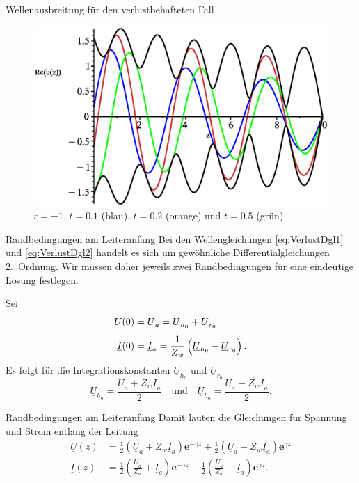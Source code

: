 \documentclass{beamer}
\begin{document}
\begin{frame}{Wellenausbreitung für den verlustbehafteten Fall}
\begin{figure}[H]
\begin{minipage}{0.32\textwidth}
            \includegraphics[width=\linewidth]{../graphics/Enveloppe/verlustbehaftet/R-1}
            \caption*{$r=-1$, $t=0.1$ (blau), $t=0.2$ (orange) und $t=0.5$ (grün)}
        \end{minipage}
    \end{figure}
\end{frame}


\begin{frame}{Randbedingungen am Leiteranfang}
Bei den Wellengleichungen \eqref{eq:VerlustDgl1} und \eqref{eq:VerlustDgl2} handelt es sich um
gewöhnliche Differentialgleichungen 2.~Ordnung. Wir müssen daher jeweils zwei Randbedingungen für
eine eindeutige Lösung festlegen.

\vspace{1ex}
Sei
\begin{align*}
    \underline{U}(0) &= \underline{U}_{a} = \underline{U}_{h_{0}} + \underline{U}_{r_{0}} \\[1ex]
    \underline{I}(0) &= \underline{I}_{a} = \frac{1}{Z_{w}}
    \left(
    \vphantom{\sqrt{1}{Z_{w}}}
    \underline{U}_{h_{0}} - \underline{U}_{r_{0}} \right).
\end{align*}
Es folgt für die Integrationskonstanten $\underline{U}_{h_{0}}$ und $\underline{U}_{r_{0}}$
\[ \underline{U}_{h_{0}} = \frac{\underline{U}_{a} + Z_{w} \underline{I}_{a}}{2}
\quad \text{und} \quad
\underline{U}_{h_{0}} = \frac{\underline{U}_{a} - Z_{w} \underline{I}_{a}}{2}. \]
\end{frame}


\begin{frame}{Randbedingungen am Leiteranfang}
Damit lauten die Gleichungen für Spannung und Strom entlang der Leitung
\begin{align}
    \underline{U}(z) &=
    \frac{1}{2} \left( \underline{U}_{a} + Z_{w} \underline{I}_{a} \right) \mathbf{e}^{- \gamma z}
    +
    \frac{1}{2} \left( \underline{U}_{a} - Z_{w} \underline{I}_{a} \right) \mathbf{e}^{\gamma z} \label{eq:UxA}
    \\[1ex]
    \underline{I}(z) &=
    \frac{1}{2} \left( \frac{\underline{U}_{a}}{Z_{w}} + \underline{I}_{a} \right) \mathbf{e}^{- \gamma z}
    -
    \frac{1}{2} \left( \frac{\underline{U}_{a}}{Z_{w}} - \underline{I}_{a} \right) \mathbf{e}^{\gamma z}
    \label{eq:IxA}
    .
\end{align}
\end{frame}
\end{document}
